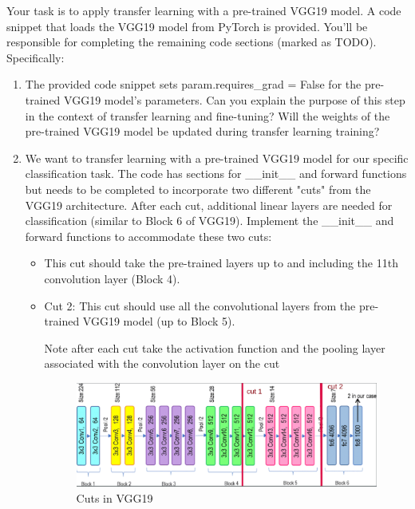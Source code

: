 \documentclass[11pt]{scrartcl}
\begin{document}
Your task is to apply transfer learning with a pre-trained VGG19 model. 
A code snippet that loads the VGG19 model from PyTorch is provided. 
You'll be responsible for completing the remaining code sections (marked as TODO). 
Specifically:

\begin{enumerate}
    \item The provided code snippet sets param.requires\_grad = False 
	for the pre-trained VGG19 model's parameters. 
	Can you explain the purpose of this step in the context of transfer learning and fine-tuning? 
	Will the weights of the pre-trained VGG19 model be updated during transfer learning training?

    \item We want to transfer learning with a pre-trained VGG19 model 
	for our specific classification task. The code has sections for \_\_init\_\_ 
	and forward functions but needs to be completed to incorporate two different "cuts" 
	from the VGG19 architecture. 
	After each cut, additional linear layers are needed for classification 
	(similar to Block 6 of VGG19).
	Implement the \_\_init\_\_ and forward functions to accommodate these two cuts:

	\begin{itemize}
		\item This cut should take the pre-trained layers up to 
		and including the 11th convolution layer (Block 4).

		\item Cut 2: This cut should use all the convolutional layers 
		from the pre-trained VGG19 model (up to Block 5).
		
		Note after each cut take the activation function and the pooling layer 
		associated with the convolution layer on the cut

		\begin{figure}[th]
			\centering
			\includegraphics[scale=0.33]{cuts.png}
			\caption{Cuts in VGG19}
			\label{fig:model-vgg19}
		\end{figure}
	\end{itemize}


\end{enumerate}
\end{document}
